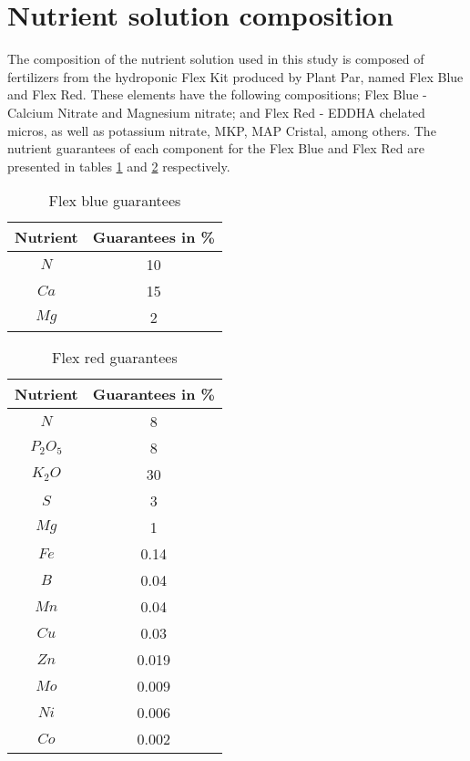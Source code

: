 \documentclass[preprint, review, 12pt]{elsarticle}
\begin{document}
\appendix

\section{Nutrient solution composition}
\label{ap:nutrient}

The composition of the nutrient solution used in this study is composed of fertilizers from the hydroponic Flex Kit produced by Plant Par, named Flex Blue and Flex Red. These elements have the following compositions; Flex Blue - Calcium Nitrate and Magnesium nitrate; and Flex Red - EDDHA chelated micros, as well as potassium nitrate, MKP, MAP Cristal, among others. The nutrient guarantees of each component for the Flex Blue and Flex Red are presented in tables \ref{tab:flexBlue} and \ref{tab:flexRed} respectively. 

\begin{table}[H]
    \centering
    \begin{tabular}{c|c}
         \textbf{Nutrient} & Guarantees in \%\\
         \hline
         $N$ & 10\\
         $Ca$ & 15\\
         $Mg$ & 2\\
         \hline
    \end{tabular}
    \caption{Flex blue guarantees}
    \label{tab:flexBlue}
\end{table}


\begin{table}[H]
    \centering
    \begin{tabular}{c|c}
         \textbf{Nutrient} & Guarantees in \%\\
         \hline
         $N$ & 8\\
         $P_2O_5$ & 8\\
         $K_2O$ & 30 \\
         $S$ & 3 \\
         $Mg$ & 1 \\
         $Fe$ & 0.14 \\
         $B$ & 0.04 \\
         $Mn$ & 0.04 \\
         $Cu$ & 0.03 \\
         $Zn$ & 0.019 \\
         $Mo$ & 0.009 \\
         $Ni$ & 0.006 \\
         $Co$ & 0.002 \\
         \hline
    \end{tabular}
    \caption{Flex red guarantees}
    \label{tab:flexRed}
\end{table}
\end{document}
